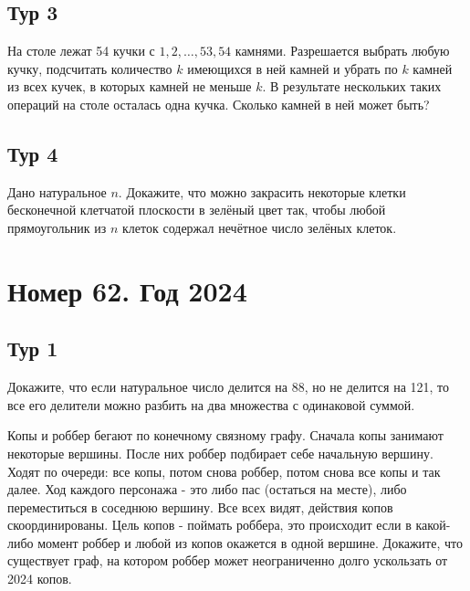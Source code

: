 \documentclass[11pt, a4paper]{common/document_template}
\begin{document}
\section{Тур 3}

\begin{exercise}
На столе лежат 54 кучки с $1, 2, \dots, 53, 54$ камнями. Разрешается выбрать любую кучку, подсчитать количество $k$ имеющихся в ней камней и убрать по $k$ камней из всех кучек, в которых камней не меньше $k$. В результате нескольких таких операций на столе осталась одна кучка. Сколько камней в ней может быть?
\end{exercise}

\section{Тур 4}

\begin{exercise}
Дано натуральное $n$. Докажите, что можно закрасить некоторые клетки бесконечной клетчатой плоскости в зелёный цвет так, чтобы любой прямоугольник из $n$ клеток содержал нечётное число зелёных клеток.
\end{exercise}


\chapter{Номер 62. Год 2024}

\section{Тур 1}

\begin{exercise}
Докажите, что если натуральное число делится на 88, но не делится на 121, то все его делители можно разбить на два множества с одинаковой суммой.
\end{exercise}

\begin{exercise}
Копы и роббер бегают по конечному связному графу. Сначала копы занимают некоторые вершины. После них роббер подбирает себе начальную вершину. Ходят по очереди: все копы, потом снова роббер, потом снова все копы и так далее. Ход каждого персонажа - это либо пас (остаться на месте), либо переместиться в соседнюю вершину. Все всех видят, действия копов скоординированы. Цель копов - поймать
роббера, это происходит если в какой-либо момент роббер и любой из копов окажется в одной вершине. Докажите, что существует граф, на котором роббер может неограниченно долго ускользать от 2024 копов.
\end{exercise}
\end{document}
